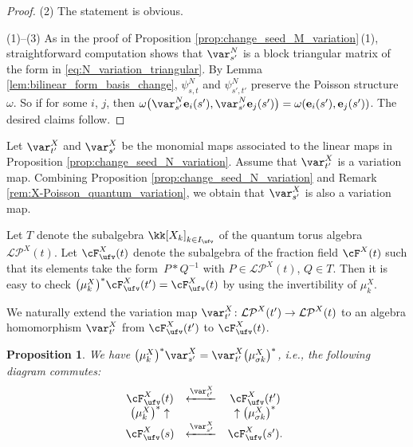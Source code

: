 \documentclass[pdftex]{sigma}
\newcommand{\Iufv}{I_{\ufv}}
\newcommand{\LP}{{\mathcal{LP}}}
\newcommand{\ee}{\mathbf{e}}
\numberwithin{equation}{section}
\newtheorem{Proposition}[Theorem]{Proposition}
 { \theoremstyle{definition}
\newtheorem{Definition}[Theorem]{Definition}
\newtheorem{Note}[Theorem]{Note}
\newtheorem{Example}[Theorem]{Example}
\newtheorem{Remark}[Theorem]{Remark}
\newtheorem{Assumption}[Theorem]{Assumption}
}
\begin{document}
\begin{proof}
(2) The statement is obvious.

(1)--(3) As in the proof of Proposition \ref{prop:change_seed_M_variation}\,(1),
straightforward computation shows that $\var_{s'}^{N}$ is a block
triangular matrix of the form in \eqref{eq:N_variation_triangular}.
By Lemma \ref{lem:bilinear_form_basis_change}, $\psi_{s,t}^{N}$
and $\psi_{s',t'}^{N}$ preserve the Poisson structure $\omega$.
So if \smash{$\omega\bigl(\var_{t'}^{N}\ee{}_{i}(t'),\var_{t'}^{N}\ee{}_{j}(t')\bigr)=\omega(\ee{}_{i}(t'),\ee{}_{j}(t'))$}
for some $i$, $j$, then $\omega\bigl(\var_{s'}^{N}\ee{}_{i}(s'),\var_{s'}^{N}\ee{}_{j}(s')\bigr)=\omega(\ee{}_{i}(s'),\ee{}_{j}(s'))$.
The desired claims follow.
\end{proof}

Let $\var_{t'}^{X}$ and $\var_{s'}^{X}$ be the monomial maps associated to the linear maps in Proposition \ref{prop:change_seed_N_variation}. Assume that $\var_{t'}^{X}$ is a variation map. Combining Proposition \ref{prop:change_seed_N_variation} and Remark \ref{rem:X-Poisson_quantum_variation}, we obtain that $\var_{s'}^{X}$ is also a variation map.

Let $T$ denote the subalgebra $\kk[X_k]_{k\in \Iufv}$ of the quantum torus algebra $\LP^X(t)$. Let $\cF_{\ufv}^X(t)$ denote the subalgebra of the fraction field $\cF^X(t)$ such that its elements take the form~$P*Q^{-1}$ with $P\in \LP^X(t)$, $Q\in T$. Then it is easy to check $\big(\mu_k^X\big)^* \cF_{\ufv}^X(t')=\cF_{\ufv}^X(t)$ by using the invertibility of $\mu_k^X$.

We naturally extend the variation map $\var_{t'}^X\colon\LP^X(t')\rightarrow\LP^X(t)$ to an algebra homomorphism $\var_{t'}^X$ from $\cF_{\ufv}^X(t')$ to $\cF_{\ufv}^X(t)$.

\begin{Proposition}\label{prop:change_seed_X_variation}
We have $\big(\mu_{k}^{X}\big)^{*}\var_{s'}^{X}=\var_{t'}^{X}\big(\mu_{\sigma k}^{X}\big)^{*}$,
i.e., the following diagram commutes:
\begin{align*}
 \begin{array}{@{}ccc}
 \cF^X_{\ufv}(t) & \xleftarrow{\var_{t'}^{X}} & \cF^X_{\ufv}(t')\\
 \big(\mu_{k}^{X}\big)^{*}\uparrow & & \uparrow\big(\mu_{\sigma k}^{X}\big)^{*}\\
 \cF^X_{\ufv}(s) & \xleftarrow{\var_{s'}^{X}} & \cF^X_{\ufv}(s').
 \end{array}
 \end{align*}
\end{Proposition}
\end{document}
